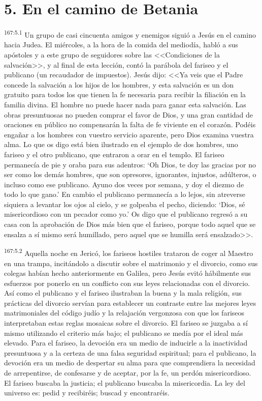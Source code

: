 \section*{5. En el camino de Betania}
\par 
\textsuperscript{167:5.1} Un grupo de casi cincuenta amigos y enemigos siguió a Jesús en el camino hacia Judea. El miércoles, a la hora de la comida del mediodía, habló a sus apóstoles y a este grupo de seguidores sobre las <<Condiciones de la salvación>>, y al final de esta lección, contó la parábola del fariseo y el publicano (un recaudador de impuestos). Jesús dijo: <<Ya veis que el Padre concede la salvación a los hijos de los hombres, y esta salvación es un don gratuito para todos los que tienen la fe necesaria para recibir la filiación en la familia divina. El hombre no puede hacer nada para ganar esta salvación. Las obras presuntuosas no pueden comprar el favor de Dios, y una gran cantidad de oraciones en público no compensarán la falta de fe viviente en el corazón. Podéis engañar a los hombres con vuestro servicio aparente, pero Dios examina vuestra alma. Lo que os digo está bien ilustrado en el ejemplo de dos hombres, uno fariseo y el otro publicano, que entraron a orar en el templo. El fariseo permanecía de pie y oraba para sus adentros: `Oh Dios, te doy las gracias por no ser como los demás hombres, que son opresores, ignorantes, injustos, adúlteros, o incluso como ese publicano. Ayuno dos veces por semana, y doy el diezmo de todo lo que gano.' En cambio el publicano permanecía a lo lejos, sin atreverse siquiera a levantar los ojos al cielo, y se golpeaba el pecho, diciendo: `Dios, sé misericordioso con un pecador como yo.' Os digo que el publicano regresó a su casa con la aprobación de Dios más bien que el fariseo, porque todo aquel que se ensalza a sí mismo será humillado, pero aquel que se humilla será ensalzado>>.

\par 
\textsuperscript{167:5.2} Aquella noche en Jericó, los fariseos hostiles trataron de coger al Maestro en una trampa, incitándolo a discutir sobre el matrimonio y el divorcio, como sus colegas habían hecho anteriormente en Galilea, pero Jesús evitó hábilmente sus esfuerzos por ponerlo en un conflicto con sus leyes relacionadas con el divorcio. Así como el publicano y el fariseo ilustraban la buena y la mala religión, sus prácticas del divorcio servían para establecer un contraste entre las mejores leyes matrimoniales del código judío y la relajación vergonzosa con que los fariseos interpretaban estas reglas mosaicas sobre el divorcio. El fariseo se juzgaba a sí mismo utilizando el criterio más bajo; el publicano se medía por el ideal más elevado. Para el fariseo, la devoción era un medio de inducirle a la inactividad presuntuosa y a la certeza de una falsa seguridad espiritual; para el publicano, la devoción era un medio de despertar su alma para que comprendiera la necesidad de arrepentirse, de confesarse y de aceptar, por la fe, un perdón misericordioso. El fariseo buscaba la justicia; el publicano buscaba la misericordia. La ley del universo es: pedid y recibiréis; buscad y encontraréis.

